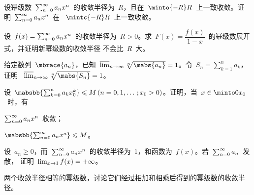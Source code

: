 \begin{exercise}
\item 设幂级数~$\sum_{n=0}^\infty a_nx^n$~的收敛半径为~$R$，且在~$\minto{-R}R$~上一致收敛。证明~$\sum_{n=0}^\infty a_nx^n$~在
~$\mintc{-R}R$~上一致收敛。
\item 设~$f(x)=\sum_{n=0}^\infty a_nx^n$~的收敛半径为~$R>0$。求~$F(x)=\dfrac{f(x)}{1-x}$~的幂级数展开式，并证明新幂级数的收敛半径
不会比~$R$~大。
\item 给定数列~$\mbrace{a_n}$，已知~$\limsup_\ntoinf\sqrt[n]{\mabs{a_n}}=1$。令~$S_n=\sum_{k=1}^na_k$，证明
~$\limsup_\ntoinf\sqrt[n]{\mabs{S_n}}=1$。
\item 设~$\mabsbb{\sum_{k=0}^na_kx_0^k}\leq M\mcond{n=0,1,\dotsc;x_0>0}$。证明，当~$x\in\minto 0{x_0}$~时，有
\begin{exlistcols}
  \item $\sum_{n=0}^\infty a_nx^n$~收敛；
  \item $\mabsbb{\sum_{n=0}^\sinf a_nx^n}\leq M$。
\end{exlistcols}
\item 设~$a_n\geq0$，而~$\sum_{n=0}^\infty a_nx^n$~的收敛半径为~$1$，和函数为~$f(x)$。若~$\sum_{n=0}^\infty a_n$~发散，%
证明~$\lim_{x\to1}f(x)={+\infty}$。
\item 两个收敛半径相等的幂级数，讨论它们经过相加和相乘后得到的幂级数的收敛半径。
\end{exercise}

